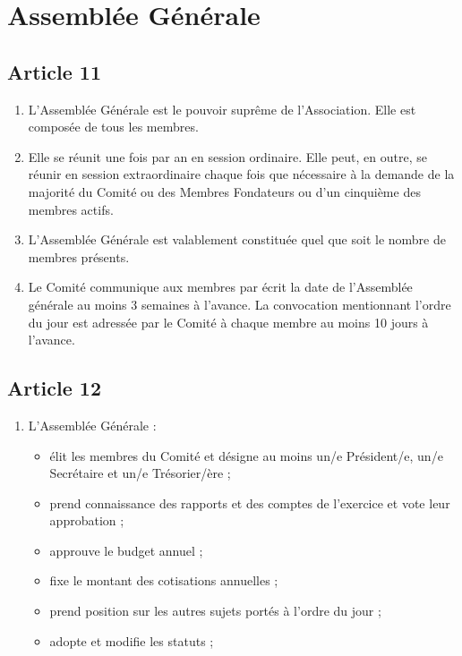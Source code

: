 \documentclass[12pt,twoside]{report}
\begin{document}
\section*{Assemblée Générale}

\subsection*{Article 11}
\begin{enumerate}
\item L’Assemblée Générale est le pouvoir suprême de l’Association. Elle est composée de tous les membres.

\item Elle se réunit une fois par an en session ordinaire. Elle peut, en outre, se réunir en session extraordinaire chaque fois que nécessaire à la demande de la majorité du Comité ou des Membres Fondateurs ou d’un cinquième des membres actifs.

\item L’Assemblée Générale est valablement constituée quel que soit le nombre de membres présents.

\item Le Comité communique aux membres par écrit la date de l'Assemblée générale au moins 3 semaines à l'avance. La convocation mentionnant l'ordre du jour est adressée par le Comité à chaque membre au moins 10 jours à l'avance.
\end{enumerate}

\subsection*{Article 12}
\begin{enumerate}
\item L’Assemblée Générale :
\begin{itemize}
\item élit les membres du Comité et désigne au moins un/e Président/e, un/e Secrétaire et un/e Trésorier/ère ;
\item prend connaissance des rapports et des comptes de l’exercice et vote leur approbation ;
\item approuve le budget annuel ;
\item fixe le montant des cotisations annuelles ;
\item prend position sur les autres sujets portés à l’ordre du jour ;
\item adopte et modifie les statuts ;
\end{itemize}
\end{enumerate}
\end{document}
